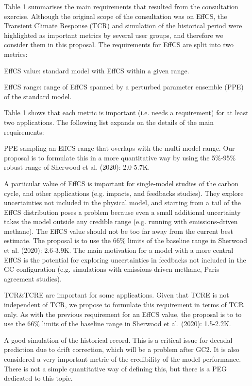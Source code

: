 \documentclass[gmd, manuscript]{copernicus}
\begin{document}
Table 1 summarises the main requirements that resulted from the consultation exercise. Although the original scope of the consultation was on EffCS, the Transient Climate Response (TCR) and simulation of the historical period were highlighted as important metrics by several user groups, and therefore we consider them in this proposal. The requirements for EffCS are split into two metrics:

EffCS value: standard model with EffCS within a given range.

EffCS range: range of EffCS spanned by a perturbed parameter ensemble (PPE) of the standard model.

Table 1 shows that each metric is important (i.e. needs a requirement) for at least two applications.
The following list expands on the details of the main requirements: 

PPE sampling an EffCS range that overlaps with the multi-model range.
Our proposal is to formulate this in a more quantitative way by using the 5\%-95\% robust range of Sherwood et al. (2020): 2.0-5.7K.

A particular value of EffCS is important for single-model studies of the carbon cycle, and other applications (e.g. impacts, and feedbacks studies).
They explore uncertainties not included in the physical model, and starting from a tail of the EffCS distribution poses a problem because even a small additional uncertainty takes the model outside any credible range (e.g. running with emissions-driven methane).
The EffCS value should not be too far away from the current best estimate. The proposal is to use the 66\% limits of the baseline range in Sherwood et al. (2020): 2.6-3.9K.
The main motivation for a model with a more central EffCS is the potential for exploring uncertainties in feedbacks not included in the GC configuration (e.g. simulations with emissions-driven methane, Paris agreement studies). 

TCR\&TCRE are important for some applications.
Given that TCRE is not independent of TCR, we propose to formulate this requirement in terms of TCR only.
As with the previous requirement for an EffCS value, the proposal is to to use the 66\% limits of the baseline range in Sherwood et al. (2020): 1.5-2.2K.

A good simulation of the historical record.
This is a critical issue for decadal prediction due to drift correction, which will be a problem after GC2.
It is also considered a very important metric of the credibility of the model performance.
There is not a simple quantitative way of defining this, but there is a PEG dedicated to this topic.
\end{document}
